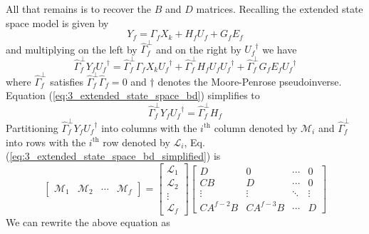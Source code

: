 All that remains is to recover the $B$ and $D$ matrices. Recalling the extended state space model is given by
\begin{equation*}
Y_f = \Gamma_f X_k + H_f U_f + G_f E_f
\end{equation*}
and multiplying on the left by $\hat{\Gamma}_f^\perp$ and on the right by ${U_f}^\dagger$ we have
\begin{equation}\label{eq:3_extended_state_space_bd}
\hat{\Gamma}_f^\perp Y_f {U_f}^\dagger = \hat{\Gamma}_f^\perp\Gamma_f X_k {U_f}^\dagger + \hat{\Gamma}_f^\perp H_f U_f {U_f}^\dagger + \hat{\Gamma}_f^\perp G_f E_f {U_f}^\dagger
\end{equation}
where $\hat{\Gamma}_f^\perp$ satisfies $\hat{\Gamma}_f^\perp\hat{\Gamma}_f = 0$ and $\dagger$ denotes the Moore-Penrose pseudoinverse. Equation (\ref{eq:3_extended_state_space_bd}) simplifies to
\begin{equation}\label{eq:3_extended_state_space_bd_simplified}
\hat{\Gamma}_f^\perp Y_f {U_f}^\dagger = \hat{\Gamma}_f^\perp H_f 
\end{equation}
Partitioning $\hat{\Gamma}_f^\perp Y_f {U_f}^\dagger$ into columns with the $i^{\mbox{th}}$ column denoted by $\mathcal{M}_i$ and $\hat{\Gamma}_f^\perp$ into rows with the $i^{\mbox{th}}$ row denoted by $\mathcal{L}_i$, Eq. (\ref{eq:3_extended_state_space_bd_simplified}) is
\begin{equation*}
\begin{bmatrix}\mathcal{M}_1 & \mathcal{M}_2 & \cdots & \mathcal{M}_f\end{bmatrix} = 
\begin{bmatrix}\mathcal{L}_1\\ \mathcal{L}_2\\ \vdots\\ \mathcal{L}_f\end{bmatrix}
\begin{bmatrix}
D & 0 & \cdots & 0\\
CB & D & \cdots & 0\\
\vdots & \vdots  & \ddots & \vdots\\
CA^{f-2}B & CA^{f-3}B & \cdots & D
\end{bmatrix}
\end{equation*}
We can rewrite the above equation as
